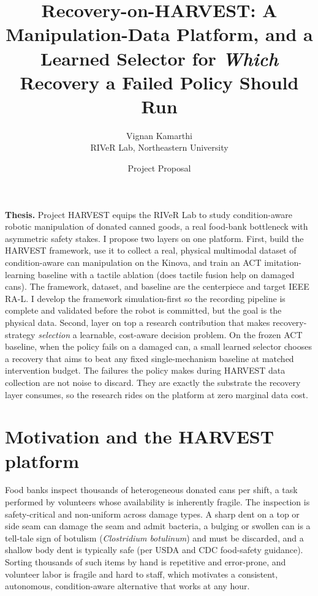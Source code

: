 \documentclass[11pt]{article}
\title{\vspace{-2.5em}Recovery-on-HARVEST: A Manipulation-Data Platform, and a Learned Selector for \emph{Which} Recovery a Failed Policy Should Run}
\author{Vignan Kamarthi\\ \small RIVeR Lab, Northeastern University}
\date{Project Proposal}
\begin{document}
\maketitle
\vspace{-1.5em}

\noindent\textbf{Thesis.} Project HARVEST equips the RIVeR Lab to study condition-aware robotic manipulation of donated canned goods, a real food-bank bottleneck with asymmetric safety stakes. I propose two layers on one platform. First, build the HARVEST framework, use it to collect a real, physical multimodal dataset of condition-aware can manipulation on the Kinova, and train an ACT imitation-learning baseline with a tactile ablation (does tactile fusion help on damaged cans). The framework, dataset, and baseline are the centerpiece and target IEEE RA-L. I develop the framework simulation-first so the recording pipeline is complete and validated before the robot is committed, but the goal is the physical data. Second, layer on top a research contribution that makes recovery-strategy \emph{selection} a learnable, cost-aware decision problem. On the frozen ACT baseline, when the policy fails on a damaged can, a small learned selector chooses a recovery that aims to beat any fixed single-mechanism baseline at matched intervention budget. The failures the policy makes during HARVEST data collection are not noise to discard. They are exactly the substrate the recovery layer consumes, so the research rides on the platform at zero marginal data cost.

\section{Motivation and the HARVEST platform}
Food banks inspect thousands of heterogeneous donated cans per shift, a task performed by volunteers whose availability is inherently fragile. The inspection is safety-critical and non-uniform across damage types. A sharp dent on a top or side seam can damage the seam and admit bacteria, a bulging or swollen can is a tell-tale sign of botulism (\emph{Clostridium botulinum}) and must be discarded, and a shallow body dent is typically safe (per USDA and CDC food-safety guidance). Sorting thousands of such items by hand is repetitive and error-prone, and volunteer labor is fragile and hard to staff, which motivates a consistent, autonomous, condition-aware alternative that works at any hour.
\end{document}
